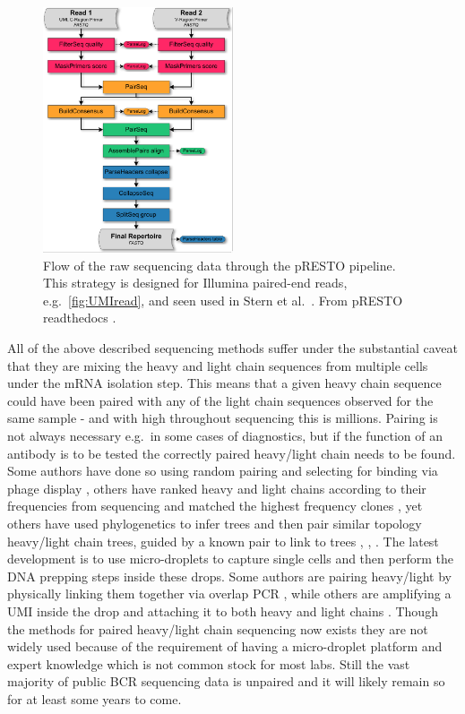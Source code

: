 \begin{figure}[ht]
    \centering
    \includegraphics[width=0.5\textwidth]{figures/Stern2014_Flowchart.pdf}
    \caption{
        \label{fig:UMIread_flow}
        Flow of the raw sequencing data through the pRESTO pipeline. This strategy is designed for Illumina paired-end reads, e.g.\ \ref{fig:UMIread}, and seen used in Stern et al.\ \cite{stern2014b}. From pRESTO readthedocs \cite{vander2014presto}.
    }
\end{figure}


All of the above described sequencing methods suffer under the substantial caveat that they are mixing the heavy and light chain sequences from multiple cells under the mRNA isolation step.
This means that a given heavy chain sequence could have been paired with any of the light chain sequences observed for the same sample - and with high throughout sequencing this is millions.
Pairing is not always necessary e.g.\ in some cases of diagnostics, but if the function of an antibody is to be tested the correctly paired heavy/light chain needs to be found.
Some authors have done so using random pairing and selecting for binding via phage display \cite{glanville2009precise}, others have ranked heavy and light chains according to their frequencies from sequencing and matched the highest frequency clones \cite{reddy2010monoclonal}, yet others have used phylogenetics to infer trees and then pair similar topology heavy/light chain trees, guided by a known pair to link to trees \cite{Zhu_undated-zz}, \cite{kwong2017antibodyomics}, \cite{huang2016identification}.
The latest development is to use micro-droplets to capture single cells and then perform the DNA prepping steps inside these drops.
Some authors are pairing heavy/light by physically linking them together via overlap PCR \cite{mcdaniel2016ultra}, while others are amplifying a UMI inside the drop and attaching it to both heavy and light chains \cite{Briggs134841}.
Though the methods for paired heavy/light chain sequencing now exists they are not widely used because of the requirement of having a micro-droplet platform and expert knowledge which is not common stock for most labs.
Still the vast majority of public BCR sequencing data is unpaired and it will likely remain so for at least some years to come.



